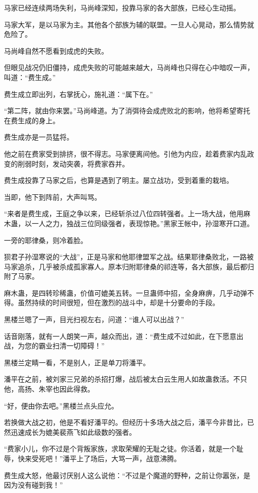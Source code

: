 \begin{this_body}
马家已经连续两场失利，马尚峰深知，投靠马家的各大部族，已经心生动摇。

马家大军，是以马家为主。其他各个部族为辅的联盟。一旦人心晃动，那么情势就危险了。

马尚峰自然不愿看到成虎的失败。

但眼见战况仍旧僵持，成虎失败的可能越来越大，马尚峰也只得在心中暗叹一声，叫道：“费生成。”

费生成立即出列，右掌抚心，施礼道：“属下在。”

“第二阵，就由你来罢。”马尚峰道。为了消弭待会成虎败北的影响，他将希望寄托在费生成的身上。

费生成亦是一员猛将。

他之前在费家受到排挤，很不得志。马家便离间他。引他为内应，趁着费家内乱政变的削弱时刻，发动突袭，将费家吞并。

费生成投靠了马家之后，也算是遇到了明主。屡立战功，受到着重的栽培。

当即，他下到阵前，大声叫骂。

“来者是费生成，王庭之争以来，已经斩杀过八位四转强者。上一场大战，他用麻木蛊，以一人之力，独战三位同级强者，表现惊艳。”黑家王帐中，孙湿寒开口道。

一旁的耶律桑，则冷着脸。

狈君子孙湿寒说的“大战”，正是马家和他耶律盟军之战。结果耶律桑败北，一路被马家追杀，几乎被杀成孤家寡人。原本归附耶律桑的祁连等，各大部族，最后都归附了马家。

麻木蛊，是四转珍稀蛊，价值可媲美五转。一旦蛊师中招，全身麻痹，几乎动弹不得。虽然持续的时间很短，但在激烈的战斗中，却是十分要命的手段。

黑楼兰嗯了一声，目光扫视左右，问道：“谁人可以出战？”

话音刚落，就有一人朗笑一声，越众而出，道：“费生成不过如此，在下愿意出战，为您的霸业扫清一切障碍！”

黑楼兰定睛一看，不是别人，正是单刀将潘平。

潘平在之前，被刘家三兄弟的杀招打爆，战后被太白云生用人如故蛊救活。不只他，高扬、朱宰也因此得救。

“好，便由你去吧。”黑楼兰点头应允。

若换做大战之初，他是不看好潘平的。但经历十多场大战之后，潘平今非昔比，已然迅速成长为媲美裴燕飞如此级数的强者。

“费家小儿，你不过是个背叛家族，求取荣耀的无耻之徒。你活着，就是一个耻辱，快来受死吧！”潘平上了场后，大骂一声，战意沸腾。

费生成大怒，他最讨厌别人这么说他：“不过是个魔道的野种，之前让你嚣张，是因为没有碰到我！”


\end{this_body}
